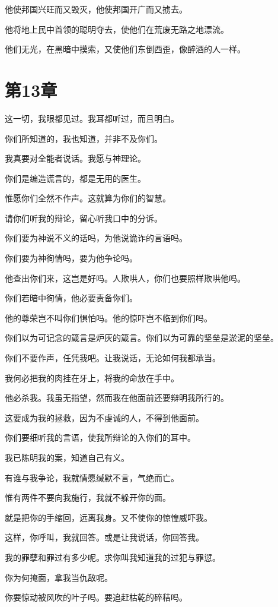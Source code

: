\documentclass[12pt,oneside]{book}
\begin{document}
他使邦国兴旺而又毁灭，他使邦国开广而又掳去。

他将地上民中首领的聪明夺去，使他们在荒废无路之地漂流。

他们无光，在黑暗中摸索，又使他们东倒西歪，像醉酒的人一样。



\chapter{第13章}
这一切，我眼都见过。我耳都听过，而且明白。

你们所知道的，我也知道，并非不及你们。

我真要对全能者说话。我愿与神理论。

你们是编造谎言的，都是无用的医生。

惟愿你们全然不作声。这就算为你们的智慧。

请你们听我的辩论，留心听我口中的分诉。

你们要为神说不义的话吗，为他说诡诈的言语吗。

你们要为神徇情吗，要为他争论吗。

他查出你们来，这岂是好吗。人欺哄人，你们也要照样欺哄他吗。

你们若暗中徇情，他必要责备你们。

他的尊荣岂不叫你们惧怕吗。他的惊吓岂不临到你们吗。

你们以为可记念的箴言是炉灰的箴言。你们以为可靠的坚垒是淤泥的坚垒。

你们不要作声，任凭我吧。让我说话，无论如何我都承当。

我何必把我的肉挂在牙上，将我的命放在手中。

他必杀我。我虽无指望，然而我在他面前还要辩明我所行的。

这要成为我的拯救，因为不虔诚的人，不得到他面前。

你们要细听我的言语，使我所辩论的入你们的耳中。

我已陈明我的案，知道自己有义。

有谁与我争论，我就情愿缄默不言，气绝而亡。

惟有两件不要向我施行，我就不躲开你的面。

就是把你的手缩回，远离我身。又不使你的惊惶威吓我。

这样，你呼叫，我就回答。或是让我说话，你回答我。

我的罪孽和罪过有多少呢。求你叫我知道我的过犯与罪愆。

你为何掩面，拿我当仇敌呢。

你要惊动被风吹的叶子吗。要追赶枯乾的碎秸吗。
\end{document}
